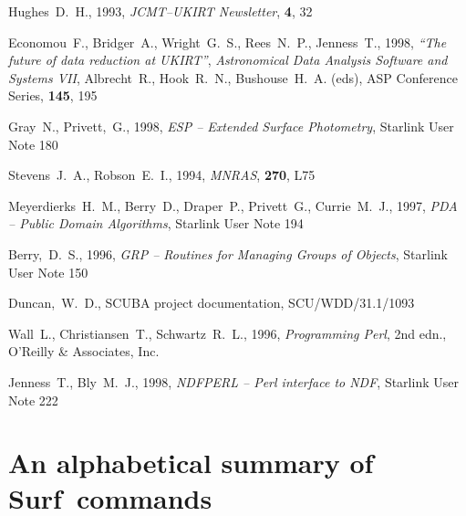\documentclass[twoside,11pt]{article}
\newcommand{\scusoft}          {{\sc Surf}}
\newcommand{\htmladdnormallink}[2]{#1}
\newcommand{\xref}[3]{#1}
\newcommand{\xlabel}[1]{}
\renewcommand{\_}{\texttt{\symbol{95}}}
\begin{document}
\begin{thebibliography}{}
Hughes~D.~H., 1993, {\it JCMT--UKIRT Newsletter}, {\bf 4}, 32

Economou~F., Bridger~A., Wright~G.~S., Rees~N.~P., Jenness~T., 1998, 
\htmladdnormallink{\textit{``The future of data reduction at UKIRT''}}{http://www.stsci.edu/stsci/meetings/adassVII/economouf.html},
\emph{Astronomical Data Analysis Software and Systems VII}, Albrecht~R.,
Hook~R.~N., Bushouse~H.~A. (eds), ASP Conference Series, \textbf{145}, 195

Gray~N., Privett,~G., 1998, {\it ESP -- Extended Surface Photometry},
\xref{Starlink User Note 180}{sun180}{}


Stevens~J.~A.,  Robson~E.~I.,  1994, {\it  MNRAS}, {\bf 270}, L75


Meyerdierks~H.~M., Berry~D., Draper~P., Privett~G., Currie~M.~J., 1997,
\textit{PDA -- Public Domain Algorithms}, 
\xref{Starlink User Note 194}{sun194}{}

Berry,~D.~S., 1996, 
\textit{GRP -- Routines for Managing Groups of Objects},
\xref{Starlink User Note 150}{sun150}{}

Duncan,~W.~D., SCUBA project documentation, SCU/WDD/31.1/1093

Wall~L., Christiansen~T., Schwartz~R.~L., 1996, 
\htmladdnormallink{\textit{Programming Perl}}{http://www.perl.org/}, 2nd
edn., \htmladdnormallink{O'Reilly \& Associates, Inc.}{http://www.ora.com/}

Jenness~T., Bly~M.~J., 1998,
\textit{NDFPERL -- Perl interface to NDF},
\xref{Starlink User Note 222}{sun222}{}

\end{thebibliography}


\appendix

\clearpage

\section{\xlabel{alphabet}An alphabetical summary of \scusoft\ commands\label{alphabet}}
\end{document}
